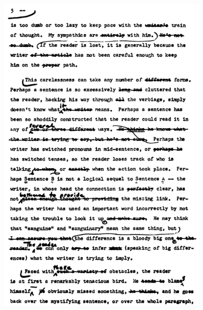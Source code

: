 \begin{figure}[!htb]
\centering
\includegraphics[width=0.9\textwidth]{figure/fig1-1.png}
\end{figure}


